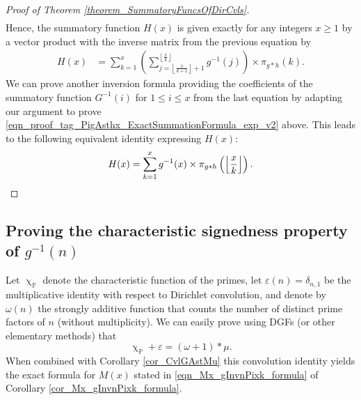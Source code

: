 \documentclass[11pt,reqno,a4letter]{article}
\numberwithin{figure}{section}
\numberwithin{table}{section}
\newcommand{\floor}[1]{\left\lfloor #1 \right\rfloor}
\renewcommand{\chi}{\upchi}
\newcommand{\Floor}[2]{\ensuremath{\left\lfloor \frac{#1}{#2} \right\rfloor}}
\theoremstyle{plain}
\numberwithin{theorem}{section}
\theoremstyle{definition}
\begin{document}
\begin{proof}[Proof of Theorem \ref{theorem_SummatoryFuncsOfDirCvls}]
\begin{align*}
\end{align*} 
Hence, the summatory function $H(x)$ is given exactly for any integers $x \geq 1$ 
by a vector product with the inverse matrix from the previous equation by 
\begin{align*} 
H(x) & = \sum_{k=1}^x \left(\sum_{j=\floor{\frac{x}{k+1}}+1}^{\floor{\frac{x}{k}}} g^{-1}(j)\right) 
     \times \pi_{g \ast h}(k). 
\end{align*} 
We can prove another inversion formula providing the coefficients of the summatory function 
$G^{-1}(i)$ for $1 \leq i \leq x$ from the last equation by adapting our argument to prove 
\eqref{eqn_proof_tag_PigAsthx_ExactSummationFormula_exp_v2} above. 
This leads to the following equivalent identity expressing $H(x)$: 
\[
H(x) = \sum_{k=1}^{x} g^{-1}(x) \times \pi_{g \ast h}\left(\Floor{x}{k}\right). 
     \qedhere 
\]
\end{proof} 

\subsection{Proving the characteristic signedness property of $g^{-1}(n)$} 

Let $\chi_{\mathbb{P}}$ denote the characteristic function of the primes, let 
$\varepsilon(n) = \delta_{n,1}$ be the multiplicative identity with respect to Dirichlet convolution, 
and denote by $\omega(n)$ the strongly additive function that counts the number of 
distinct prime factors of $n$ (without multiplicity). We can easily prove using DGFs 
(or other elementary methods) that 
\begin{equation}
\label{eqn_AntiqueDivisorSumIdent} 
\chi_{\mathbb{P}} + \varepsilon = (\omega + 1) \ast \mu. 
\end{equation} 
When combined with Corollary \ref{cor_CvlGAstMu} 
this convolution identity yields the exact 
formula for $M(x)$ stated in \eqref{eqn_Mx_gInvnPixk_formula} of 
Corollary \ref{cor_Mx_gInvnPixk_formula}. 
\end{document}

